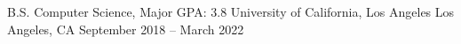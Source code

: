 \documentclass[12pt, letterpaper]{awesome-cv}
\begin{document}
\begin{cventries}

  \cventry
    {B.S. Computer Science, Major GPA: 3.8} %
    {University of California, Los Angeles} %
    {Los Angeles, CA} %
    {September 2018 -- March 2022} %
    {
    }
  \vspace{-0.2in}
\end{cventries}


\end{document}
